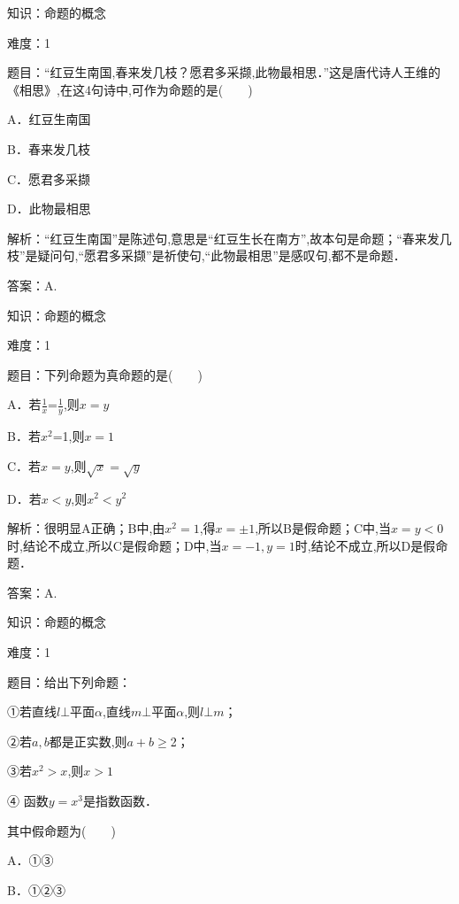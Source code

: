 \documentclass{article} %
\begin{document}


\noindent 

\noindent 

\noindent 

\noindent 

\noindent 

\noindent 

知识：命题的概念

难度：1

题目：``红豆生南国,春来发几枝？愿君多采撷,此物最相思．''这是唐代诗人王维的《相思》,在这4句诗中,可作为命题的是(　　)

A．红豆生南国   

B．春来发几枝

C．愿君多采撷   

D．此物最相思

解析：``红豆生南国''是陈述句,意思是``红豆生长在南方'',故本句是命题；``春来发几枝''是疑问句,``愿君多采撷''是祈使句,``此物最相思''是感叹句,都不是命题．

答案：A.



知识：命题的概念

难度：1

题目：下列命题为真命题的是(　　)

A．若$\frac{1}{x}$=$\frac{1}{y}$,则$x=y$

B．若$x^{2}$=1,则$x=1$

C．若$x=y$,则$\sqrt{x}=\sqrt{y}$

D．若$x<y$,则$x^2<y^2$

解析：很明显A正确；B中,由$x^{2}=1$,得$x={\pm}1$,所以B是假命题；C中,当$x=y<0$时,结论不成立,所以C是假命题；D中,当$x=-1,y=1$时,结论不成立,所以D是假命题．

答案：A.



知识：命题的概念

难度：1

题目：给出下列命题：

①若直线$l\bot$平面$\alpha$,直线$m{\bot}$平面$\alpha$,则$l{\bot}m$；

②若$a,b$都是正实数,则$a+b{\ge}$2；

③若$x^{2}>x$,则$x>1$

④ 函数$y=x^{3}$是指数函数．

其中假命题为(　　)

A．①③   

B．①②③
\end{document}

